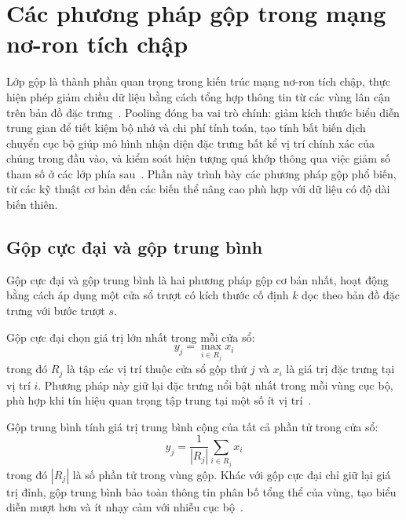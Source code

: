 \section{Các phương pháp gộp trong mạng nơ-ron tích chập}
\label{sec:pooling_methods}

Lớp gộp là thành phần quan trọng trong kiến trúc mạng nơ-ron tích chập, thực hiện phép giảm chiều dữ liệu bằng cách tổng hợp thông tin từ các vùng lân cận trên bản đồ đặc trưng~\cite{goodfellow2016deep}. Pooling đóng ba vai trò chính: giảm kích thước biểu diễn trung gian để tiết kiệm bộ nhớ và chi phí tính toán, tạo tính bất biến dịch chuyển cục bộ giúp mô hình nhận diện đặc trưng bất kể vị trí chính xác của chúng trong đầu vào, và kiểm soát hiện tượng quá khớp thông qua việc giảm số tham số ở các lớp phía sau~\cite{lecun2015deep}. Phần này trình bày các phương pháp gộp phổ biến, từ các kỹ thuật cơ bản đến các biến thể nâng cao phù hợp với dữ liệu có độ dài biến thiên.

\subsection{Gộp cực đại và gộp trung bình}
\label{subsec:max_avg_pooling}

Gộp cực đại và gộp trung bình là hai phương pháp gộp cơ bản nhất, hoạt động bằng cách áp dụng một cửa sổ trượt có kích thước cố định $k$ dọc theo bản đồ đặc trưng với bước trượt $s$.

Gộp cực đại chọn giá trị lớn nhất trong mỗi cửa sổ:
\begin{equation}
y_j = \max_{i \in R_j} x_i
\label{eq:max_pooling}
\end{equation}
trong đó $R_j$ là tập các vị trí thuộc cửa sổ gộp thứ $j$ và $x_i$ là giá trị đặc trưng tại vị trí $i$. Phương pháp này giữ lại đặc trưng nổi bật nhất trong mỗi vùng cục bộ, phù hợp khi tín hiệu quan trọng tập trung tại một số ít vị trí~\cite{goodfellow2016deep}.

Gộp trung bình tính giá trị trung bình cộng của tất cả phần tử trong cửa sổ:
\begin{equation}
y_j = \frac{1}{|R_j|} \sum_{i \in R_j} x_i
\label{eq:avg_pooling}
\end{equation}
trong đó $|R_j|$ là số phần tử trong vùng gộp. Khác với gộp cực đại chỉ giữ lại giá trị đỉnh, gộp trung bình bảo toàn thông tin phân bố tổng thể của vùng, tạo biểu diễn mượt hơn và ít nhạy cảm với nhiễu cục bộ~\cite{goodfellow2016deep}.

